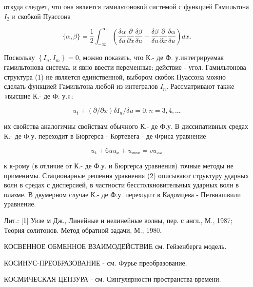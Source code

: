 \documentclass[10pt]{article}
\begin{document}
откуда следует, что она является гамильтоновой системой с функцией Гамильтона $I_{2}$ и скобкой Пуассона



\[

\{\alpha, \beta\}=\frac{1}{2} \int_{-\infty}^{\infty}\left(\frac{\delta \alpha}{\delta u} \frac{\partial}{\partial x} \frac{\delta \beta}{\delta u}-\frac{\delta \beta}{\delta u} \frac{\partial}{\partial x} \frac{\delta \alpha}{\delta u}\right) d x .

\]



Поскольку $\left\{I_{n}, I_{m}\right\}=0$, можно показать, что К.- де Ф. у.интегрируемая гамильтонова система, и явно ввести переменные: действие - угол. Гамильтонова структура (1) не является единственной, выбором скобок Пуассона можно сделать функцией Гамильтона любой из интегралов $I_{n}$. Рассматривают также «высшие К.- де Ф. у.»:



\[

u_{t}+(\partial / \partial x) \delta I_{n} / \delta u=0, n=3,4, \ldots

\]



их свойства аналогичны свойствам обычного К.- де Ф.у. В диссипативных средах К.- де Ф.у. переходит в Бюргерса - Кортевега - де Фриса уравнение



\[

u_{t}+6 u u_{x}+u_{x x x}=v u_{x x}

\]



к к-рому (в отличие от К.- де Ф.у. и Бюргерса уравнения) точные методы не применимы. Стационарные решения уравнения (2) описывают структуру ударных волн в средах с дисперсией, в частности бесстолкновительных ударных волн в плазме. В двумерном случае К.- де Ф.у. переходит в Кадомцева - Петвиашвили уравнение.



Лит.: [1] Уизе м Дж., Линейные и нелинейные волны, пер. с англ., М., 1987; Теория солитонов. Метод обратной задачи, М., 1980.



КОСВЕННОЕ ОБМЕННОЕ ВЗАИМОДЕЙСТВИЕ см. Гейзенберга модель.



КОСИНУС-ПРЕОБРАЗОВАНИЕ - см. Фурье преобразование.



КОСМИЧЕСКАЯ ЦЕНЗУРА - см. Сингулярности пространства-времени.
\end{document}
